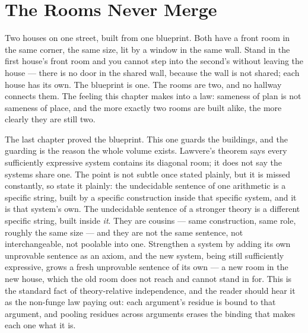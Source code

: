 \chapter{The Rooms Never Merge}

\begin{intuition}
Two houses on one street, built from one blueprint. Both have a front
room in the same corner, the same size, lit by a window in the same wall.
Stand in the first house's front room and you cannot step into the
second's without leaving the house --- there is no door in the shared
wall, because the wall is not shared; each house has its own. The
blueprint is one. The rooms are two, and no hallway connects them. The
feeling this chapter makes into a law: sameness of plan is not sameness of
place, and the more exactly two rooms are built alike, the more clearly
they are still two.
\end{intuition}

The last chapter proved the blueprint. This one guards the buildings, and
the guarding is the reason the whole volume exists. Lawvere's theorem says
every sufficiently expressive system contains its diagonal room; it does
not say the systems share one. The point is not subtle once stated
plainly, but it is missed constantly, so state it plainly: the undecidable
sentence of one arithmetic is a specific string, built by a specific
construction inside that specific system, and it is that system's own. The
undecidable sentence of a stronger theory is a different specific string,
built inside \emph{it}. They are cousins --- same construction, same
role, roughly the same size --- and they are not the same sentence, not
interchangeable, not poolable into one. Strengthen a system by adding its
own unprovable sentence as an axiom, and the new system, being still
sufficiently expressive, grows a fresh unprovable sentence of its own ---
a new room in the new house, which the old room does not reach and cannot
stand in for. This is the standard fact of theory-relative independence,
and the reader should hear it as the non-funge law paying out: each
argument's residue is bound to that argument, and pooling residues across
arguments erases the binding that makes each one what it is.


